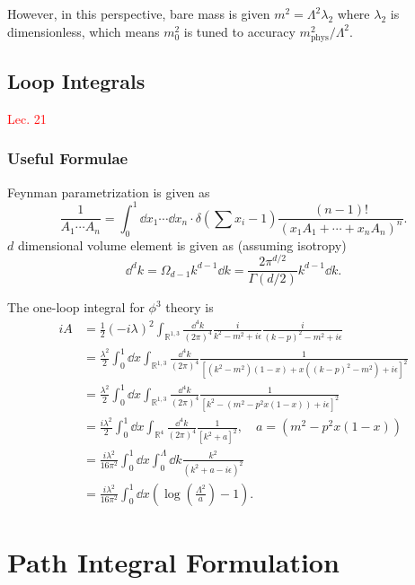 \documentclass{article}
\begin{document}
However, in this perspective, bare mass is given $m^2=\Lambda^2\lambda_2$ where $\lambda_2$ is dimensionless, which means $m_0^2$ is tuned to accuracy $m^2_\text{phys}/\Lambda^2$.

\subsection{Loop Integrals}
\textcolor{red}{Lec. 21}
\subsubsection{Useful Formulae}
Feynman parametrization is given as 
\begin{equation}
    \frac 1{A_1\cdots A_n}=\int^1_0\dd x_1\cdots\dd x_n\cdot\delta\left(\sum x_i-1\right)\frac{(n-1)!}{\left(x_1A_1+\cdots+x_nA_n\right)^n}.
\end{equation}
$d$ dimensional volume element is given as (assuming isotropy)
\begin{equation}
    \dd^dk=\Omega_{d-1}k^{d-1}\dd k=\frac{2\pi^{d/2}}{\Gamma(d/2)}k^{d-1}\dd k.
\end{equation}

The one-loop integral for $\phi^3$ theory is 
\begin{align*}
    iA&=\frac 12(-i\lambda)^2\int_{\mathbb R^{1,3}}\frac{\dd^4k}{(2\pi)^4}\frac{i}{k^2-m^2+i\epsilon}\frac{i}{(k-p)^2-m^2+i\epsilon}\\
    &=\frac{\lambda^2}{2}\int^1_0\dd x\int_{\mathbb R^{1,3}}\frac{\dd^4k}{(2\pi)^4}\frac{1}{[(k^2-m^2)(1-x)+x((k-p)^2-m^2)+i\epsilon]^2}\\
    &=\frac{\lambda^2}{2}\int^1_0\dd x\int_{\mathbb R^{1,3}}\frac{\dd^4k}{(2\pi)^4}\frac{1}{[k^2-(m^2-p^2x(1-x))+i\epsilon]^2}\\
    &=\frac{i\lambda^2}{2}\int^1_0\dd x\int_{\mathbb R^4}\frac{\dd^4k}{(2\pi)^4}\frac{1}{[k^2+a]^2},\quad a=(m^2-p^2x(1-x))\\
    &=\frac{i\lambda^2}{16\pi^2}\int^1_0\dd x\int^\Lambda_0\dd k\frac{k^2}{(k^2+a-i\epsilon)^2}\\
    &=\frac{i\lambda^2}{16\pi^2}\int^1_0\dd x\left(\log\left(\frac{\Lambda^2}{a}\right)-1\right).
\end{align*}


\pagebreak

\section{Path Integral Formulation}
\end{document}
